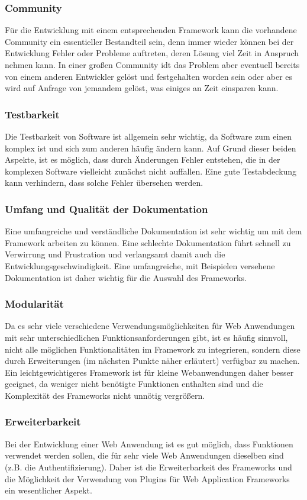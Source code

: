 \subsubsection*{Community}
Für die Entwicklung mit einem entsprechenden Framework kann die vorhandene Community ein essentieller Bestandteil sein, denn immer wieder können bei der Entwicklung Fehler oder Probleme auftreten, deren Lösung viel Zeit in Anspruch nehmen kann. In einer großen Community idt das Problem aber eventuell bereits von einem anderen Entwickler gelöst und festgehalten worden sein oder aber es wird auf Anfrage von jemandem gelöst, was einiges an Zeit einsparen kann.
\subsubsection*{Testbarkeit}
Die Testbarkeit von Software ist allgemein sehr wichtig, da Software zum einen komplex ist und sich zum anderen häufig ändern kann. Auf Grund dieser beiden Aspekte, ist es möglich, dass durch Änderungen Fehler entstehen, die in der komplexen Software vielleicht zunächst nicht auffallen. Eine gute Testabdeckung kann verhindern, dass solche Fehler übersehen werden.
\subsubsection*{Umfang und Qualität der Dokumentation}
Eine umfangreiche und verständliche Dokumentation ist sehr wichtig um mit dem Framework arbeiten zu können. Eine schlechte Dokumentation führt schnell zu Verwirrung und Frustration und verlangsamt damit auch die Entwicklungsgeschwindigkeit. Eine umfangreiche, mit Beispielen versehene Dokumentation ist daher wichtig für die Auswahl des Frameworks.\autocite[S.214]{EFCMW2013}
\subsubsection*{Modularität}
Da es sehr viele verschiedene Verwendungsmöglichkeiten für Web Anwendungen mit sehr unterschiedlichen Funktionsanforderungen gibt, ist es häufig sinnvoll, nicht alle möglichen Funktionalitäten im Framework zu integrieren, sondern diese durch Erweiterungen (im nächsten Punkte näher erläutert) verfügbar zu machen. Ein leichtgewichtigeres Framework ist für kleine Webanwendungen daher besser geeignet, da weniger nicht benötigte Funktionen enthalten sind und die Komplexität des Frameworks nicht unnötig vergrößern.\autocite[S.214]{EFCMW2013}
\subsubsection*{Erweiterbarkeit}
Bei der Entwicklung einer Web Anwendung ist es gut möglich, dass Funktionen verwendet werden sollen, die für sehr viele Web Anwendungen dieselben sind (z.B. die Authentifizierung). Daher ist die Erweiterbarkeit des Frameworks und die Möglichkeit der Verwendung von Plugins für Web Application Frameworks ein wesentlicher Aspekt.\autocite[S.214]{EFCMW2013}
